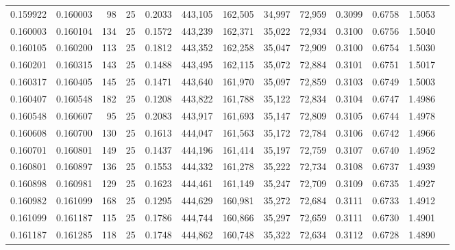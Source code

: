 \begin{tabular}{rrrrrrrrrrrrr}
0.159922 & 0.160003 &    98 &  25 &                                     0.2033 & 443,105 & 162,505 &  34,997 &  72,959 & 0.3099 & 0.6758 & 1.5053 \\
0.160003 & 0.160104 &   134 &  25 &                                     0.1572 & 443,239 & 162,371 &  35,022 &  72,934 & 0.3100 & 0.6756 & 1.5040 \\
0.160105 & 0.160200 &   113 &  25 &                                     0.1812 & 443,352 & 162,258 &  35,047 &  72,909 & 0.3100 & 0.6754 & 1.5030 \\
0.160201 & 0.160315 &   143 &  25 &                                     0.1488 & 443,495 & 162,115 &  35,072 &  72,884 & 0.3101 & 0.6751 & 1.5017 \\
0.160317 & 0.160405 &   145 &  25 &                                     0.1471 & 443,640 & 161,970 &  35,097 &  72,859 & 0.3103 & 0.6749 & 1.5003 \\
0.160407 & 0.160548 &   182 &  25 &                                     0.1208 & 443,822 & 161,788 &  35,122 &  72,834 & 0.3104 & 0.6747 & 1.4986 \\
0.160548 & 0.160607 &    95 &  25 &                                     0.2083 & 443,917 & 161,693 &  35,147 &  72,809 & 0.3105 & 0.6744 & 1.4978 \\
0.160608 & 0.160700 &   130 &  25 &                                     0.1613 & 444,047 & 161,563 &  35,172 &  72,784 & 0.3106 & 0.6742 & 1.4966 \\
0.160701 & 0.160801 &   149 &  25 &                                     0.1437 & 444,196 & 161,414 &  35,197 &  72,759 & 0.3107 & 0.6740 & 1.4952 \\
0.160801 & 0.160897 &   136 &  25 &                                     0.1553 & 444,332 & 161,278 &  35,222 &  72,734 & 0.3108 & 0.6737 & 1.4939 \\
0.160898 & 0.160981 &   129 &  25 &                                     0.1623 & 444,461 & 161,149 &  35,247 &  72,709 & 0.3109 & 0.6735 & 1.4927 \\
0.160982 & 0.161099 &   168 &  25 &                                     0.1295 & 444,629 & 160,981 &  35,272 &  72,684 & 0.3111 & 0.6733 & 1.4912 \\
0.161099 & 0.161187 &   115 &  25 &                                     0.1786 & 444,744 & 160,866 &  35,297 &  72,659 & 0.3111 & 0.6730 & 1.4901 \\
0.161187 & 0.161285 &   118 &  25 &                                     0.1748 & 444,862 & 160,748 &  35,322 &  72,634 & 0.3112 & 0.6728 & 1.4890 \\

\end{tabular}
